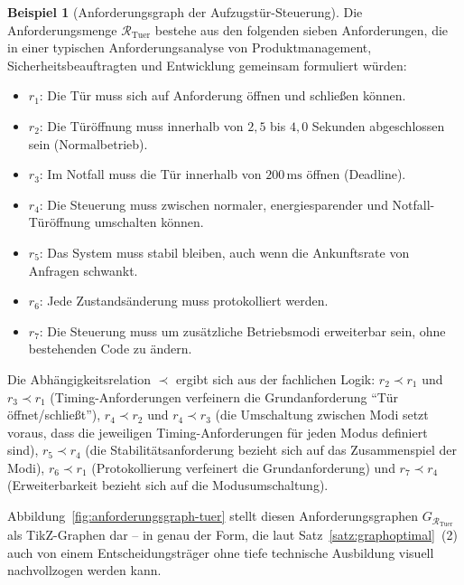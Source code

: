 ﻿\documentclass[a4paper,12pt]{report}
\theoremstyle{definition}
\newtheorem{beispiel}{Beispiel}[section]
\begin{document}
\begin{beispiel}[Anforderungsgraph der Aufzugstür-Steuerung]
\label{bsp:aufzugstuer-graph}
Die Anforderungsmenge $\mathcal{R}_{\text{Tuer}}$ bestehe aus den folgenden
sieben Anforderungen, die in einer typischen Anforderungsanalyse von
Produktmanagement, Sicherheitsbeauftragten und Entwicklung gemeinsam
formuliert würden:
\begin{itemize}
  \item $r_1$: Die Tür muss sich auf Anforderung öffnen und schließen
  können.
  \item $r_2$: Die Türöffnung muss innerhalb von $2{,}5$ bis $4{,}0$
  Sekunden abgeschlossen sein (Normalbetrieb).
  \item $r_3$: Im Notfall muss die Tür innerhalb von $200\,\text{ms}$
  öffnen (Deadline).
  \item $r_4$: Die Steuerung muss zwischen normaler, energiesparender und
  Notfall-Türöffnung umschalten können.
  \item $r_5$: Das System muss stabil bleiben, auch wenn die Ankunftsrate
  von Anfragen schwankt.
  \item $r_6$: Jede Zustandsänderung muss protokolliert werden.
  \item $r_7$: Die Steuerung muss um zusätzliche Betriebsmodi erweiterbar
  sein, ohne bestehenden Code zu ändern.
\end{itemize}
Die Abhängigkeitsrelation $\prec$ ergibt sich aus der fachlichen Logik:
$r_2 \prec r_1$ und $r_3 \prec r_1$ (Timing-Anforderungen verfeinern die
Grundanforderung ``Tür öffnet/schließt''), $r_4 \prec r_2$ und $r_4 \prec
r_3$ (die Umschaltung zwischen Modi setzt voraus, dass die jeweiligen
Timing-Anforderungen für jeden Modus definiert sind), $r_5 \prec r_4$ (die
Stabilitätsanforderung bezieht sich auf das Zusammenspiel der Modi),
$r_6 \prec r_1$ (Protokollierung verfeinert die Grundanforderung) und
$r_7 \prec r_4$ (Erweiterbarkeit bezieht sich auf die Modusumschaltung).
\end{beispiel}

Abbildung~\ref{fig:anforderungsgraph-tuer} stellt diesen Anforderungsgraphen
$G_{\mathcal{R}_{\text{Tuer}}}$ als TikZ-Graphen dar -- in genau der Form,
die laut Satz~\ref{satz:graphoptimal}~(2) auch von einem
Entscheidungsträger ohne tiefe technische Ausbildung visuell nachvollzogen
werden kann.
\end{document}
